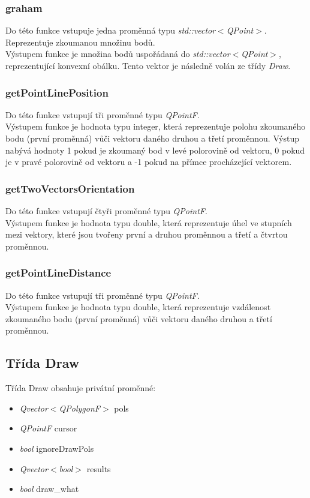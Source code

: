 \documentclass{article}
\begin{document}
\subsubsection{graham}
Do této funkce vstupuje jedna proměnná typu  \emph{std::vector$<$QPoint$>$}. Reprezentuje zkoumanou množinu bodů.\\
Výstupem funkce je množina bodů uspořádaná do \emph{std::vector$<$QPoint$>$}, reprezentující konvexní obálku. Tento vektor je následně volán ze třídy \emph{Draw}.

\subsubsection{getPointLinePosition}
Do této funkce vstupují tři proměnné typu \emph{QPointF}.\\
Výstupem funkce je hodnota typu integer, která reprezentuje polohu zkoumaného bodu (první proměnná) vůči vektoru daného druhou a třetí proměnnou. Výstup nabývá hodnoty 1 pokud je zkoumaný bod v levé polorovině od vektoru, 0 pokud je v pravé polorovině od vektoru a -1 pokud na přímce procházející vektorem.

\subsubsection{getTwoVectorsOrientation}
Do této funkce vstupují čtyři proměnné typu \emph{QPointF}.\\
Výstupem funkce je hodnota typu double, která reprezentuje úhel ve stupních mezi vektory, které jsou tvořeny první a druhou proměnnou a třetí a čtvrtou proměnnou.

\subsubsection{getPointLineDistance}
Do této funkce vstupují tři proměnné typu \emph{QPointF}.\\
Výstupem funkce je hodnota typu double, která reprezentuje vzdálenost zkoumaného bodu (první proměnná) vůči vektoru daného druhou a třetí proměnnou.

\newpage
\subsection{Třída Draw \label{sec:draw}}
Třída Draw obsahuje privátní proměnné:
\begin{itemize}
\item \emph{Qvector$<$QPolygonF$>$} pols
\item \emph{QPointF} cursor
\item \emph{bool} ignoreDrawPols
\item \emph{Qvector$<$bool$>$} results
\item \emph{bool} draw\_what
\end{itemize}
\end{document}
